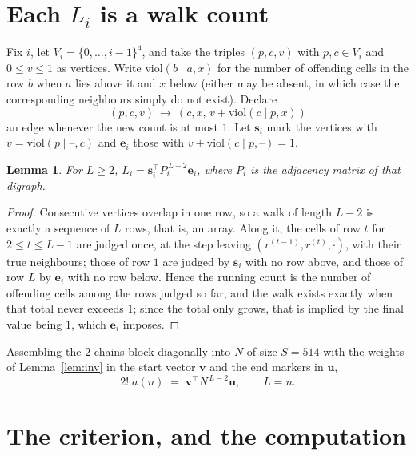 \documentclass[11pt,a4paper]{article}
\theoremstyle{plain}
\newtheorem{lemma}[theorem]{Lemma}
\theoremstyle{definition}
\begin{document}
\section{Each $L_i$ is a walk count}

Fix $i$, let $V_i=\{0,\dots,i-1\}^{4}$, and take the triples $(p,c,v)$ with
$p,c\in V_i$ and $0\le v\le1$ as vertices. Write $\mathrm{viol}(b\mid a,x)$ for the number
of offending cells in the row $b$ when $a$ lies above it and $x$ below (either may be
absent, in which case the corresponding neighbours simply do not exist). Declare
\[
(p,c,v)\ \longrightarrow\ (c,x,\,v+\mathrm{viol}(c\mid p,x))
\]
an edge whenever the new count is at most $1$. Let $\mathbf{s}_i$ mark the vertices with
$v=\mathrm{viol}(p\mid\text{--},c)$ and $\mathbf{e}_i$ those with
$v+\mathrm{viol}(c\mid p,\text{--})=1$.

\begin{lemma}\label{lem:walk}
For $L\ge2$, $L_i=\mathbf{s}_i^{\!\top}P_i^{\,L-2}\mathbf{e}_i$, where $P_i$ is the
adjacency matrix of that digraph.
\end{lemma}

\begin{proof}
Consecutive vertices overlap in one row, so a walk of length $L-2$ is exactly a sequence
of $L$ rows, that is, an array. Along it, the cells of row $t$ for $2\le t\le L-1$ are
judged once, at the step leaving $(r^{(t-1)},r^{(t)},\cdot)$, with their true neighbours;
those of row $1$ are judged by $\mathbf{s}_i$ with no row above, and those of row
$L$ by $\mathbf{e}_i$ with no row below. Hence the running count is the number of
offending cells among the rows judged so far, and the walk exists exactly when that total
never exceeds $1$; since the total only grows, that is implied by the final value being
$1$, which $\mathbf{e}_i$ imposes.
\end{proof}

Assembling the $2$ chains block-diagonally into $N$ of size $S=514$ with the weights of
Lemma~\ref{lem:inv} in the start vector $\mathbf{v}$ and the end markers in
$\mathbf{u}$,
\begin{equation}\label{eq:walk2}
2!\;a(n)\;=\;\mathbf{v}^{\!\top}N^{\,L-2}\mathbf{u},\qquad L=n .
\end{equation}

\section{The criterion, and the computation}
\end{document}
